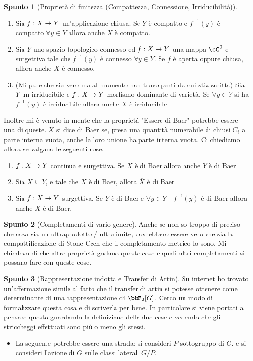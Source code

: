 \documentclass[a4paper,NoNotes,GeneralMath]{stdmdoc}
\theoremstyle{definition}
\newtheorem{spunto}{Spunto}
\begin{document}
\begin{spunto}[Proprietà di finitezza (Compattezza, Connessione, Irriducibilità)]
\begin{enumerate}
\begin{itemize}
				\end{itemize}
				\hrule
			\item Sia $f: X \rightarrow Y$ un'applicazione chiusa. Se $Y$ è compatto e $f^{-1}(y)$ è compatto $\forall y \in Y$ allora anche $X$ è compatto.
			\item Sia $Y$ uno spazio topologico connesso ed $f: X \rightarrow Y$ una mappa $\cC^0$ e surgettiva tale che $f^{-1}(y)$ è connesso $\forall y \in Y$. Se $f$ è aperta oppure chiusa, allora anche $X$ è connesso.
			\item (Mi pare che sia vero ma al momento non trovo parti da cui stia scritto) Sia $Y$ un irriducibile e $f: X \rightarrow Y$ morfismo dominante di varietà. Se $\forall y \in Y$ si ha $f^{-1}(y)$ è irriducibile allora anche $X$ è irriducibile.
		\end{enumerate}
		Inoltre mi è venuto in mente che la proprietà "Essere di Baer" potrebbe essere una di queste. $X$ si dice di Baer se, presa una quantità numerabile di chiusi $C_i$ a parte interna vuota, anche la loro unione ha parte interna vuota. Ci chiediamo allora se valgano le seguenti cose:
		\begin{enumerate}
			\item $f: X \rightarrow Y$ continua e surgettiva. Se $X$ è di Baer allora anche $Y$ è di Baer
			\item Sia $X \subseteq Y$, e tale che $X$ è di Baer, allora $\overline{X}$ è di Baer
			\item Sia $f: X \rightarrow Y$ surgettiva. Se $Y$ è di Baer e $\forall y \in Y \quad f^{-1}(y)$ è di Baer allora anche $X$ è di Baer.
		\end{enumerate}
	\end{spunto}
	
	\begin{spunto}[Completamenti di vario genere]
		Anche se non so troppo di preciso che cosa sia un ultraprodotto / ultralimite, dovrebbero essere vero che sia la compattificazione di Stone-Cech che il completamento metrico lo sono. Mi chiedevo di che altre proprietà godano queste cose e quali altri completamenti si possano fare con queste cose.
	\end{spunto}
	
	\begin{spunto}[Rappresentazione indotta e Transfer di Artin]
		Su internet ho trovato un'affermazione simile al fatto che il transfer di artin si potesse ottenere come determinante di una rappresentazione di $\bbF_2 [G]$. Cerco un modo di formalizzare questa cosa e di scriverla per bene. In particolare si viene portati a pensare questo guardando la definizione delle due cose e vedendo che gli striccheggi effettuati sono più o meno gli stessi. \\
		\begin{itemize}
			\item La seguente potrebbe essere una strada: si consideri $P$ sottogruppo di $G$. e si consideri l'azione di $G$ sulle classi laterali $G/P$. 
		\end{itemize}
	\end{spunto}
	
\end{document}
